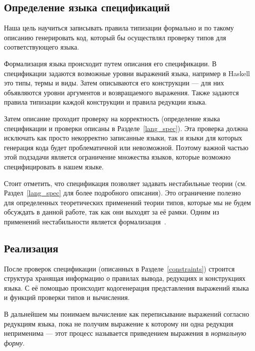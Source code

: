 \subsection*{Определение языка спецификаций}

Наша цель научиться записывать правила типизации формально и по такому описанию генерировать код, который бы осуществлял проверку типов для соответствующего языка.

Формализация языка происходит путем описания его спецификации. В спецификации задаются возможные уровни выражений языка, например в Haskell это типы, термы и виды. Затем описываются его конструкции --- для них объявляются уровни аргументов и возвращаемого выражения. Также задаются правила типизации каждой конструкции и правила редукции языка.

Затем описание проходит проверку на корректность (определение языка спецификации и проверки описаны в Разделе~\ref{lang_spec}). Эта проверка должна исключать как просто некорректно записанные языки, так и языки для которых генерация кода будет проблематичной или невозможной. Поэтому важной частью этой подзадачи является ограничение множества языков, которые возможно специфицировать в нашем языке.

Стоит отметить, что спецификация позволяет задавать нестабильные теории (см. Раздел~\ref{lang_spec} для более подробного описания). Это ограничение полезно для определенных теоретических применений теории типов, которые мы не будем обсуждать в данной работе, так как они выходят за её рамки. Одним из применений нестабильности является формализация~\cite{ncat:inf}.


\subsection*{Реализация}

После проверок спецификации (описанных в Разделе~\ref{constraints}) строится структура хранящая информацию о правилах вывода, редукциях и конструкциях языка. С её помощью происходит кодогенерация представления выражений языка и функций проверки типов и вычисления.

В дальнейшем мы понимаем вычисление как переписывание выражений согласно редукциям языка, пока не получим выражение к которому ни одна редукция неприменима --- этот процесс называется приведением выражения в \textit{нормальную форму}.

